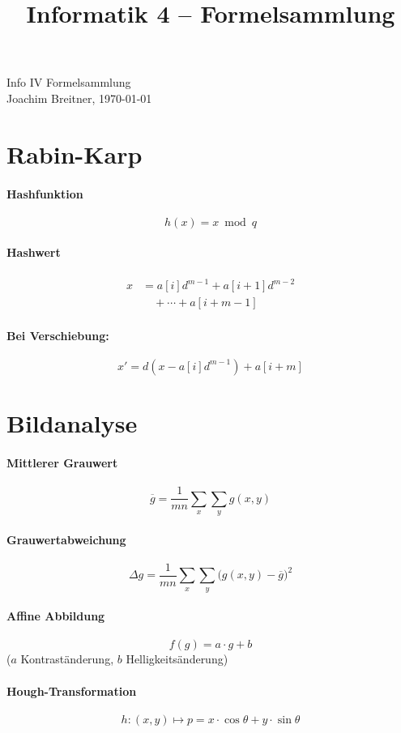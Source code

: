 \documentclass{scrartcl}
\title{Informatik 4 -- Formelsammlung}
\begin{document}
\pagestyle{empty}
\begin{center}
\sectfont \LARGE Info IV Formelsammlung\\
\normalfont \normalsize Joachim Breitner, \today
\end{center}
\begin{flushleft}
\begin{multicols}{2}
\section{Rabin-Karp}
\paragraph{Hashfunktion}
\[ h(x) = x \bmod q \]
\paragraph{Hashwert}
\begin{align*}
x &= a[i]d^{m-1} + a[i+1]d^{m-2} \\
    &\quad + \cdots + a[i+m-1]
\end{align*}
\paragraph{Bei Verschiebung:}
\[ x' = d(x-a[i]d^{m-1}) + a[i+m] \]

\section{Bildanalyse}
\paragraph{Mittlerer Grauwert}
\[ \overline{g} = \frac{1}{mn} \sum_x \sum_y g(x,y)\]
\paragraph{Grauwertabweichung}
\[ \Delta g = \frac{1}{mn} \sum_x \sum_y \big(g(x,y) - \overline g\big)^2 \]
\paragraph{Affine Abbildung}
\[ f(g) = a\cdot g + b \]
($a$ Kontraständerung, $b$ Helligkeitsänderung)
\paragraph{Hough-Transformation}
\[ h:(x,y) \mapsto p = x\cdot \cos \theta + y \cdot \sin \theta \]


\end{multicols}
\end{flushleft}
\end{document}

